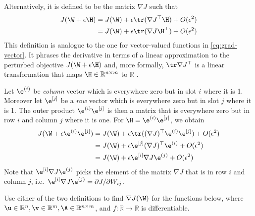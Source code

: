 Alternatively, it is defined to be the matrix $\nabla J$ such that
\begin{align}
  J(\W+\epsilon \H) &= J(\W) + \epsilon \tr(\nabla J^\top \H) + O(\epsilon^2) \label{eq:grad-matrix}\\
                    &= J(\W) + \epsilon \tr(\nabla J \H^\top) + O(\epsilon^2)
\end{align}
This definition is analogue to the one for vector-valued functions
in \eqref{eq:grad-vector}. It phrases the derivative in terms of a linear
approximation to the perturbed objective $J(\W+\epsilon \H)$ and, more formally,
$\tr \nabla J^\top$ is a linear transformation that maps
$\H \in \mathbb{R}^{n \times m}$ to $\mathbb{R}$ \citep[see e.g.][Chapter 9, for a formal treatment of derivatives]{Rudin1976}.

Let $\e^{(i)}$ be \emph{column} vector which is everywhere zero but in slot $i$
where it is 1. Moreover let $\e^{[j]}$ be a \emph{row} vector which is
everywhere zero but in slot $j$ where it is 1. The outer product
$\e^{(i)}\e^{[j]}$ is then a matrix that is everywhere zero but in row $i$ and
column $j$ where it is one. For $\H = \e^{(i)} \e^{[j]}$, we obtain
\begin{align}
  J(\W+\epsilon \e^{(i)}\e^{[j]}) &= J(\W) + \epsilon \tr((\nabla J)^\top \e^{(i)} \e^{[j]}) + O(\epsilon^2)\\
                                  &= J(\W) + \epsilon  \e^{[j]} (\nabla J)^\top \e^{(i)} + O(\epsilon^2)\\
                                  &= J(\W) + \epsilon \e^{[i]} \nabla J  \e^{(j)}+O(\epsilon^2)
\end{align}
Note that $\e^{[i]} \nabla J \e^{(j)}$ picks the element of the
matrix $\nabla J$ that is in row $i$ and column $j$, i.e.\ $\e^{[i]} \nabla J
\e^{(j)}=\partial J/\partial W_{ij}$.

Use either of the two definitions to find $\nabla
J(\W)$ for the functions below, where
$\u \in \mathbb{R}^n, \v \in \mathbb{R}^m, \A \in \mathbb{R}^{n \times m}$, and
$f: \mathbb{R} \rightarrow \mathbb{R}$ is differentiable.

